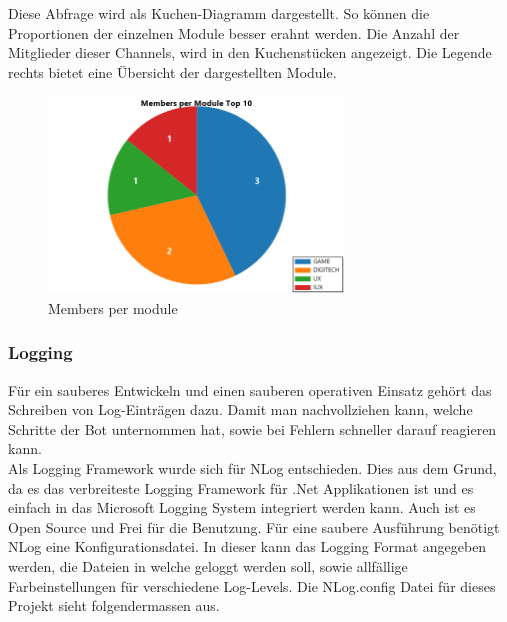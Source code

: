 \documentclass[a4paper, table]{article}
\begin{document}
Diese Abfrage wird als Kuchen-Diagramm dargestellt. So können die Proportionen der einzelnen Module besser erahnt werden.
Die Anzahl der Mitglieder dieser Channels, wird in den Kuchenstücken angezeigt.
Die Legende rechts bietet eine Übersicht der dargestellten Module.

\begin{figure}[h]
    \centering
    \includegraphics[width=0.7\textwidth]{img/membersPerModule.png}
    \caption{Members per module}
    \label{fig:members-per-module}
\end{figure}
\clearpage

\subsubsection{Logging}
Für ein sauberes Entwickeln und einen sauberen operativen Einsatz gehört das Schreiben von Log-Einträgen dazu.
Damit man nachvollziehen kann, welche Schritte der Bot unternommen hat, sowie bei Fehlern schneller darauf reagieren kann.\\
Als Logging Framework wurde sich für NLog entschieden.\autocite{noauthor_nlog_nodate}
Dies aus dem Grund, da es das verbreiteste Logging Framework für .Net Applikationen ist und es einfach in das Microsoft Logging System integriert werden kann.
Auch ist es Open Source und Frei für die Benutzung.
Für eine saubere Ausführung benötigt NLog eine Konfigurationsdatei.
In dieser kann das Logging Format angegeben werden, die Dateien in welche geloggt werden soll, sowie allfällige Farbeinstellungen für verschiedene Log-Levels.
Die NLog.config Datei für dieses Projekt sieht folgendermassen aus.
\end{document}
